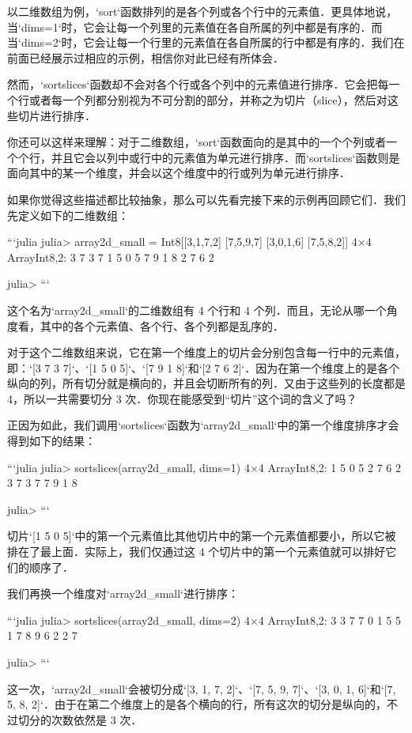 以二维数组为例，`sort`函数排列的是各个列或各个行中的元素值．更具体地说，当`dims=1`时，它会让每一个列里的元素值在各自所属的列中都是有序的．而当`dims=2`时，它会让每一个行里的元素值在各自所属的行中都是有序的．我们在前面已经展示过相应的示例，相信你对此已经有所体会．

然而，`sortslices`函数却不会对各个行或各个列中的元素值进行排序．它会把每一个行或者每一个列都分别视为不可分割的部分，并称之为切片（slice），然后对这些切片进行排序．

你还可以这样来理解：对于二维数组，`sort`函数面向的是其中的一个个列或者一个个行，并且它会以列中或行中的元素值为单元进行排序．而`sortslices`函数则是面向其中的某一个维度，并会以这个维度中的行或列为单元进行排序．

如果你觉得这些描述都比较抽象，那么可以先看完接下来的示例再回顾它们．我们先定义如下的二维数组：

```julia
julia> array2d_small = Int8[[3,1,7,2] [7,5,9,7] [3,0,1,6] [7,5,8,2]]
4×4 Array{Int8,2}:
 3  7  3  7
 1  5  0  5
 7  9  1  8
 2  7  6  2

julia> 
```

这个名为`array2d_small`的二维数组有 4 个行和 4 个列．而且，无论从哪一个角度看，其中的各个元素值、各个行、各个列都是乱序的．

对于这个二维数组来说，它在第一个维度上的切片会分别包含每一行中的元素值，即：`[3 7 3 7]`、`[1 5 0 5]`、`[7 9 1 8]`和`[2 7 6 2]`．因为在第一个维度上的是各个纵向的列，所有切分就是横向的，并且会切断所有的列．又由于这些列的长度都是 4，所以一共需要切分 3 次．你现在能感受到“切片”这个词的含义了吗？

正因为如此，我们调用`sortslices`函数为`array2d_small`中的第一个维度排序才会得到如下的结果：

```julia
julia> sortslices(array2d_small, dims=1)
4×4 Array{Int8,2}:
 1  5  0  5
 2  7  6  2
 3  7  3  7
 7  9  1  8

julia> 
```

切片`[1 5 0 5]`中的第一个元素值比其他切片中的第一个元素值都要小，所以它被排在了最上面．实际上，我们仅通过这 4 个切片中的第一个元素值就可以排好它们的顺序了．

我们再换一个维度对`array2d_small`进行排序：

```julia
julia> sortslices(array2d_small, dims=2)
4×4 Array{Int8,2}:
 3  3  7  7
 0  1  5  5
 1  7  8  9
 6  2  2  7

julia> 
```

这一次，`array2d_small`会被切分成`[3, 1, 7, 2]`、`[7, 5, 9, 7]`、`[3, 0, 1, 6]`和`[7, 5, 8, 2]`．由于在第二个维度上的是各个横向的行，所有这次的切分是纵向的，不过切分的次数依然是 3 次．

